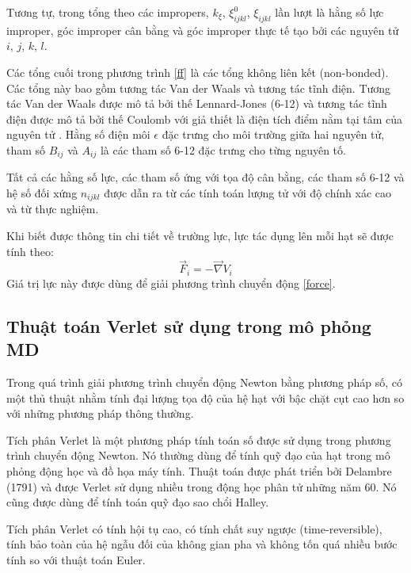 \documentclass[12pt,a4paper,reqno, oneside]{book}
\begin{document}
		Tương tự, trong tổng theo các impropers, $k_{\xi}$, $\xi^{0}_{ijkl}$, $\xi_{ijkl}$ lần lượt là hằng số lực improper, góc improper cân bằng và góc improper thực tế tạo bởi các nguyên tử $i$, $j$, $k$, $l$.
		
		Các tổng cuối trong phương trình \eqref{ff} là các tổng không liên kết (non-bonded). Các tổng này bao gồm tương tác Van der Waals và tương tác tĩnh điện. Tương tác Van der Waals được mô tả bởi thế Lennard-Jones (6-12) và tương tác tĩnh điện được mô tả bởi thế Coulomb với giả thiết là điện tích điểm nằm tại tâm của nguyên tử \cite{Ponder2003}. Hằng số điện môi $\epsilon$ đặc trưng cho môi trường giữa hai nguyên tử, tham số $B_{ij}$ và $A_{ij}$ là các tham số 6-12 đặc trưng cho từng nguyên tố.
		
		Tất cả các hằng số lực, các tham số ứng với tọa độ cân bằng, các tham số 6-12 và hệ số đối xứng $n_{ijkl}$ được dẫn ra từ các tính toán lượng tử với độ chính xác cao và từ thực nghiệm\cite{Ponder2003}.
		
		Khi biết được thông tin chi tiết về trường lực, lực tác dụng lên mỗi hạt sẽ được tính theo:
		\begin{equation}
		\vec{F}_{i} = -\vec{\nabla} V_{i}
		\end{equation}
		Giá trị lực này được dùng để giải phương trình chuyển động \ref{force}.

	\subsection{Thuật toán Verlet sử dụng trong mô phỏng MD}
	\label{verlet}
		Trong quá trình giải phương trình chuyển động Newton bằng phương pháp số, có một thủ thuật nhằm tính đại lượng tọa độ của hệ hạt với bậc chặt cụt cao hơn so với những phương pháp thông thường.
		
		Tích phân Verlet\cite{Verlet1967} là một phương pháp tính toán số được sử dụng trong phương trình chuyển động Newton. Nó thường dùng để tính quỹ đạo của hạt trong mô phỏng động học và đồ họa máy tính. Thuật toán được phát triển bởi Delambre (1791) và được Verlet sử dụng nhiều trong động học phân tử những năm 60. Nó cũng được dùng để tính toán quỹ đạo sao chổi Halley.
			
		Tích phân Verlet có tính hội tụ cao, có tính chất suy ngược (time-reversible), tính bảo toàn của hệ ngẫu đối của không gian pha và không tốn quá nhiều bước tính so với thuật toán Euler.
			
\end{document}
